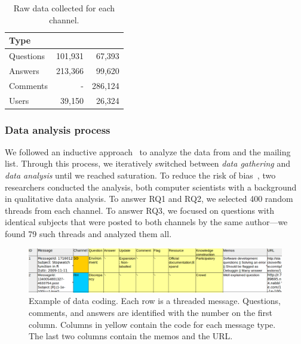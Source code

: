 	\begin{table}[!htb]
	  \centering
      \caption{Raw data collected for each channel.}
      \begin{small}
        \begin{tabular}{lrr}
	        \toprule
	        Type          &  \RH & \SO \\
	        \midrule
	        Questions     & 101,931 &  67,393 \\
	        Answers       & 213,366 &  99,620 \\
	        Comments      &       - & 286,124 \\
	        Users         &  39,150 &  26,324 \\
	        \bottomrule
        \end{tabular}
      \end{small}
	  \label{table:data}
	\end{table}





\subsubsection{Data analysis process}
\label{sec:dap}

We followed an inductive approach~\cite{Runeson2012} to analyze the data from \SO and the \RH mailing list. Through this process, we iteratively switched between \textit{data gathering} and \textit{data analysis} until we reached saturation. To reduce the risk of bias~\cite{Runeson2012}, two researchers conducted the analysis, both computer scientists with a background in qualitative data analysis. To answer RQ1 and RQ2, we selected 400 random threads from each channel. To answer RQ3, we focused on questions with identical subjects that were posted to both channels by the same author---we found 79 such threads and analyzed them all.
    
    \begin{figure}[htbp]
    	\centering
    	\includegraphics[width=.95\textwidth]{Figures/CodingExample}
    	\caption{Example of data coding. Each row is a threaded message. Questions, comments, and answers are identified with the number on the first column. Columns in yellow contain the code for each message type. The last two columns contain the memos and the URL.}
    	\label{fig:CodingExample}
    \end{figure}


